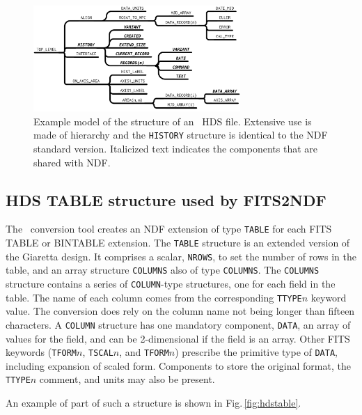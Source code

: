 \documentclass[final,authoryear,5p,times,twocolumn]{elsarticle}
\begin{document}
\begin{figure}[t]
\begin{center}
\includegraphics[width=0.7\textwidth]{model-asterix}
\end{center}
\caption{Example model of the structure of an \asterix\ HDS
  file. Extensive use is made of hierarchy and the \texttt{HISTORY}
  structure is identical to the NDF standard version. Italicized text
  indicates the components that are shared with NDF.}
\label{fig:asterix}
\end{figure}

\subsection{HDS TABLE structure used by FITS2NDF}
\label{app:hdstable}

The \fitstondf\ conversion tool \citep{SUN55} creates an NDF extension
of type \texttt{TABLE} for each FITS TABLE or BINTABLE extension. The
\texttt{TABLE} structure is an extended version of the Giaretta
design.  It comprises a scalar, \texttt{NROWS}, to set the number of
rows in the table, and an array structure \texttt{COLUMNS} also of
type \texttt{COLUMNS}.  The \texttt{COLUMNS} structure contains a
series of \texttt{COLUMN}-type structures, one for each field in the
table. The name of each column comes from the corresponding
\texttt{TTYPE$n$} keyword value.  The conversion does rely on the
column name not being longer than fifteen characters.  A
\texttt{COLUMN} structure has one mandatory component, \texttt{DATA},
an array of values for the field, and can be 2-dimensional if the
field is an array.  Other FITS keywords (\texttt{TFORM$n$},
\texttt{TSCAL$n$}, and \texttt{TFORM$n$}) prescribe the primitive type
of \texttt{DATA}, including expansion of scaled form.  Components to
store the original format, the \texttt{TTYPE$n$} comment, and units
may also be present.

An example of part of such a structure is shown in
Fig.\,\ref{fig:hdstable}.
\end{document}
